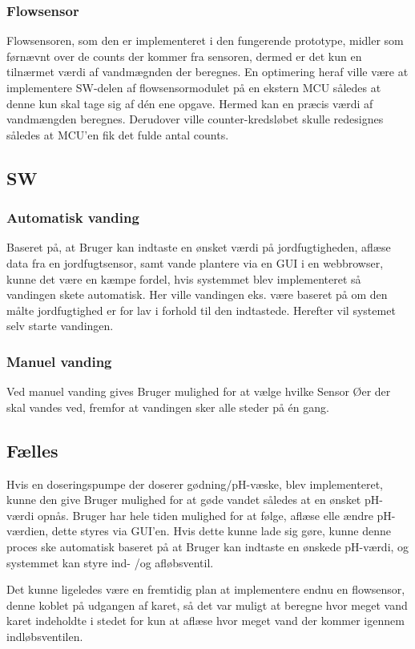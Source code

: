 \subsubsection{Flowsensor}
Flowsensoren, som den er implementeret i den fungerende prototype, midler som førnævnt over de counts der kommer fra sensoren, dermed er det kun en tilnærmet værdi af vandmægnden der beregnes. En optimering heraf ville være at implementere SW-delen af flowsensormodulet på en ekstern MCU således at denne kun skal tage sig af dén ene opgave. Hermed kan en præcis værdi af vandmængden beregnes. Derudover ville counter-kredsløbet skulle redesignes således at MCU'en fik det fulde antal counts.\newline
 
 
\subsection{SW} 
\subsubsection{Automatisk vanding}
Baseret på, at Bruger kan indtaste en ønsket værdi på jordfugtigheden, aflæse data fra en jordfugtsensor, samt vande plantere via en GUI i en webbrowser, kunne det være en kæmpe fordel, hvis systemmet blev implementeret så vandingen skete automatisk. Her ville vandingen eks. være baseret på om den målte jordfugtighed er for lav i forhold til den indtastede. Herefter vil systemet selv starte vandingen.\newline 

\subsubsection{Manuel vanding}
Ved manuel vanding gives Bruger mulighed for at vælge hvilke Sensor Øer der skal vandes ved, fremfor at vandingen sker alle steder på én gang.\newline 

\subsection{Fælles}
Hvis en doseringspumpe der doserer gødning/pH-væske, blev implementeret, kunne den give Bruger mulighed for at gøde vandet således at en ønsket pH-værdi opnås. Bruger har hele tiden mulighed for at følge, aflæse elle ændre pH-værdien, dette styres via GUI'en. Hvis dette kunne lade sig gøre, kunne denne proces ske automatisk baseret på at Bruger kan indtaste en ønskede pH-værdi, og systemmet kan styre ind- /og afløbsventil.\newline

Det kunne ligeledes være en fremtidig plan at implementere endnu en flowsensor, denne koblet på udgangen af karet, så det var muligt at beregne hvor meget vand karet indeholdte i stedet for kun at aflæse hvor meget vand der kommer igennem indløbsventilen. 